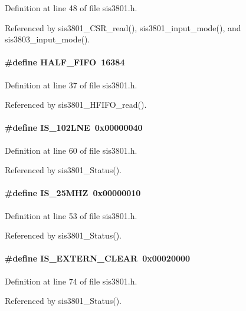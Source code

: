Definition at line 48 of file sis3801.h.

Referenced by sis3801\_\-CSR\_\-read(), sis3801\_\-input\_\-mode(), and sis3803\_\-input\_\-mode().
\paragraph[{HALF\_\-FIFO}]{\setlength{\rightskip}{0pt plus 5cm}\#define HALF\_\-FIFO~16384}\hfill\label{sis3801_8h_a541ca8b18bd6767d294b0f5161798ce8}


Definition at line 37 of file sis3801.h.

Referenced by sis3801\_\-HFIFO\_\-read().
\paragraph[{IS\_\-102LNE}]{\setlength{\rightskip}{0pt plus 5cm}\#define IS\_\-102LNE~0x00000040}\hfill\label{sis3801_8h_a1b90cd7bc7e0da3a07555e966d575f39}


Definition at line 60 of file sis3801.h.

Referenced by sis3801\_\-Status().
\paragraph[{IS\_\-25MHZ}]{\setlength{\rightskip}{0pt plus 5cm}\#define IS\_\-25MHZ~0x00000010}\hfill\label{sis3801_8h_ac60281a385d0142701dd3990e9805df7}


Definition at line 53 of file sis3801.h.

Referenced by sis3801\_\-Status().
\paragraph[{IS\_\-EXTERN\_\-CLEAR}]{\setlength{\rightskip}{0pt plus 5cm}\#define IS\_\-EXTERN\_\-CLEAR~0x00020000}\hfill\label{sis3801_8h_a7163bbe0ced8067777ffe616ce47a6d7}


Definition at line 74 of file sis3801.h.

Referenced by sis3801\_\-Status().
